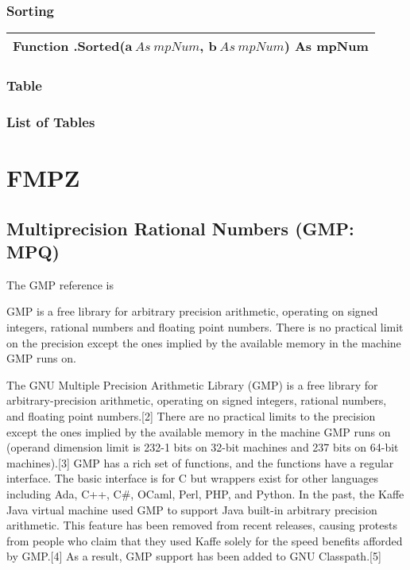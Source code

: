 \vspace{0.3cm}
\lipsum[2]





\subsection{Sorting}
\begin{tabular}{p{481pt}}
	\toprule
	\textsf{Function \textbf{.Sorted}($\boldsymbol{a}\ As\ mpNum$, $\boldsymbol{b}\ As\ mpNum$) As mpNum}\index{Multiprecision Functions!.Sorted} \\
	\bottomrule
\end{tabular}

\vspace{0.3cm}
\lipsum[1]




\subsection{Table}
\lipsum[1]


\subsection{List of Tables}
\lipsum[1]




\chapter{FMPZ}




\section{Multiprecision Rational Numbers (GMP: MPQ)}

The GMP reference is \cite{Granlund12}


GMP is a free library for arbitrary precision arithmetic, operating on signed integers, rational numbers and floating point numbers. There is no practical limit on the precision except the ones implied by the available memory in the machine GMP runs on. 

The GNU Multiple Precision Arithmetic Library (GMP) is a free library for arbitrary-precision arithmetic, operating on signed integers, rational numbers, and floating point numbers.[2] There are no practical limits to the precision except the ones implied by the available memory in the machine GMP runs on (operand dimension limit is 232-1 bits on 32-bit machines and 237 bits on 64-bit machines).[3] GMP has a rich set of functions, and the functions have a regular interface. The basic interface is for C but wrappers exist for other languages including Ada, C++, C\#, OCaml, Perl, PHP, and Python. In the past, the Kaffe Java virtual machine used GMP to support Java built-in arbitrary precision arithmetic. This feature has been removed from recent releases, causing protests from people who claim that they used Kaffe solely for the speed benefits afforded by GMP.[4] As a result, GMP support has been added to GNU Classpath.[5]

